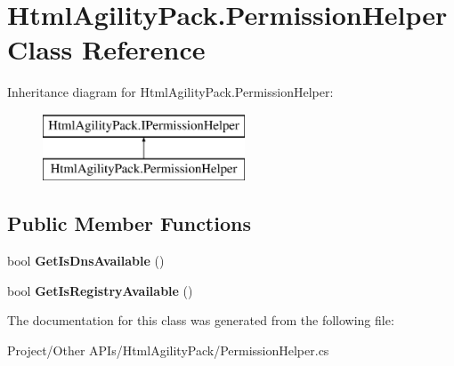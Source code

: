 \hypertarget{class_html_agility_pack_1_1_permission_helper}{}\section{Html\+Agility\+Pack.\+Permission\+Helper Class Reference}
\label{class_html_agility_pack_1_1_permission_helper}
Inheritance diagram for Html\+Agility\+Pack.\+Permission\+Helper\+:\begin{figure}[H]
\begin{center}
\leavevmode
\includegraphics[height=2.000000cm]{class_html_agility_pack_1_1_permission_helper}
\end{center}
\end{figure}
\subsection*{Public Member Functions}
\begin{DoxyCompactItemize}
\item 
\mbox{\label{class_html_agility_pack_1_1_permission_helper_a4ee5ce910b0184b153acaea3305285e8}} 
bool {\bfseries Get\+Is\+Dns\+Available} ()
\item 
\mbox{\label{class_html_agility_pack_1_1_permission_helper_ab4317f2498d3a9997e6dba12abaf6842}} 
bool {\bfseries Get\+Is\+Registry\+Available} ()
\end{DoxyCompactItemize}


The documentation for this class was generated from the following file\+:\begin{DoxyCompactItemize}
\item 
Project/\+Other A\+P\+Is/\+Html\+Agility\+Pack/Permission\+Helper.\+cs\end{DoxyCompactItemize}
